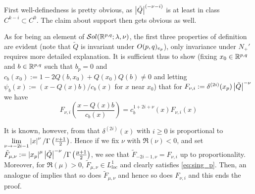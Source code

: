 \documentclass[10pt]{article} %
\theoremstyle{definition}
\theoremstyle{remark}
\begin{document}
\begin{myproof}
	First well-definedness is pretty obvious, as $\left|\tilde{Q}\right|^{(-\nu-i)}$ is at least in class $C^{k-i}\subset C^0$.
	The claim about support then gets obvious as well.

	As for being an element of $\mathcal{S}ol(\mathbb{R}^{p,q};\lambda,\nu)$, the first three properties of definition are evident (note that $\tilde{Q}$ is
	invariant under $O(p,q)_{e_p}$), only invariance
	under $N_+'$ requires more detailed explanation. It is sufficient thus to show (fixing $x_0\in\mathbb{R}^{p,q}$
	and $b\in\mathbb{R}^{p,q}$ such that $b_p=0$ and $c_b(x_0):=1-2Q(b,x_0)+Q(x_0)Q(b)\neq0$ and letting 
	$\psi_b(x):=(x-Q(x)b)/c_b(x)$ for $x$ near $x_0$) that for $F_{\nu,i}:=\delta^{(2i)}(x_p)\left|\tilde{Q}\right|^{-\nu}$ we have
	\begin{equation}
	F_{\nu,i}\left( \frac{x-Q(x)b}{c_b(x)}\right)=c_b^{1+2i+\nu}(x)F_{\nu,i}(x) 
		\label{eq:sing_p}
	\end{equation}
	
	It is known, however, from \cite[ch. I, sec. 3.5]{gelfand1980distribution}
	that $\delta^{(2i)}(x)$ with $i\geq0$ is proportional to $\lim_{\nu\to-2i-1}\myabs{x}^{\nu}/\Gamma\left( \frac{\nu+1}{2}
	\right)$. Hence if we fix $\nu$ with $\Re(\nu)<0$,
	and set $\tilde{F}_{\mu,\nu}:=\left|x_p\right|^{\mu}\left|\tilde{Q}\right|^{-\nu}/\Gamma\left( \frac{\mu
	+1}{2} \right)$, we see that $\tilde{F}_{-2i-1,\nu}=F_{\nu,i}$ up to proportionality. Moreover, for $\Re(\mu)>0$,
	$\tilde{F}_{\mu,\nu}\in L^1_{loc}$ and clearly satisfies \eqref{eq:sing_p}. Then, an analogue of 
	\cite[prop. 3.18]{kobayashi2015symmetry}
	implies that so does $\tilde{F}_{\mu,\nu}$ and hence so does $F_{\nu,i}$ and this ends the proof.
\end{myproof}
\end{document}
